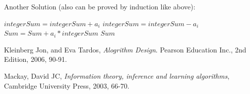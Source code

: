 \documentclass[paper=a4, fontsize=11pt]{scrartcl} %
\numberwithin{equation}{section} %
\numberwithin{figure}{section} %
\numberwithin{table}{section} %
\begin{document}
Another Solution (also can be proved by induction like above):
\begin{algorithm}
\begin{algorithmic}
	\STATE $integerSum = integerSum + a_i$
\ENDFOR
{}
	\STATE $integerSum = integerSum - a_i$
	\STATE $Sum = Sum + a_i * integerSum$
\ENDFOR
\RETURN $Sum$
\end{algorithmic}
\end{algorithm}

\begin{thebibliography}{9}

  Kleinberg Jon, and Eva Tardos,
  \emph{ Alogrithm Design}.
  Pearson Education Inc.,
  2nd Edition,
  2006, 90-91.
  
 Mackay, David JC, 
 \emph{Information theory, inference and learning algorithms},
 Cambridge University Press, 2003,
 66-70.
  
\end{thebibliography}
\end{document}
